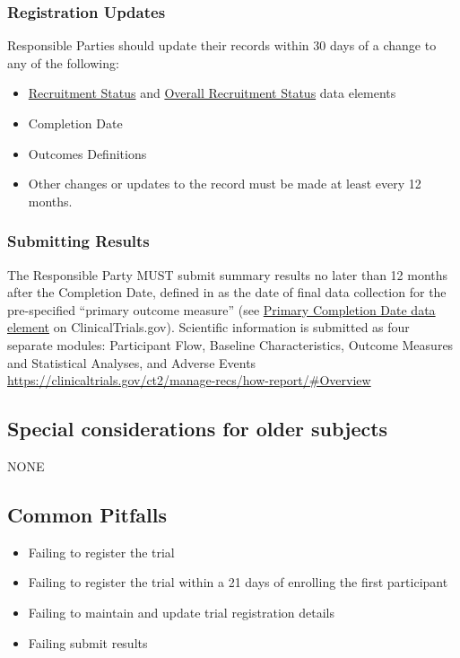 \documentclass[]{book}
\providecommand{\tightlist}{%
  \setlength{\itemsep}{0pt}\setlength{\parskip}{0pt}}
\begin{document}
\subsubsection{Registration Updates}\label{registration-updates}

Responsible Parties should update their records within 30 days of a
change to any of the following:

\begin{itemize}
\tightlist
\item
  \href{http://prsinfo.clinicaltrials.gov/definitions.html\#FacilityStatus}{Recruitment
  Status} and
  \href{http://prsinfo.clinicaltrials.gov/definitions.html\#OverallStatus}{Overall
  Recruitment Status} data elements
\item
  Completion Date
\item
  Outcomes Definitions
\item
  Other changes or updates to the record must be made at least every 12
  months.
\end{itemize}

\subsubsection{Submitting Results}\label{submitting-results}

The Responsible Party MUST submit summary results no later than 12
months after the Completion Date, defined in as the date of final data
collection for the pre-specified ``primary outcome measure'' (see
\href{http://prsinfo.clinicaltrials.gov/definitions.html\#PrimaryCompletionDate}{Primary
Completion Date data element} on ClinicalTrials.gov). Scientific
information is submitted as four separate modules: Participant Flow,
Baseline Characteristics, Outcome Measures and Statistical Analyses, and
Adverse Events
\url{https://clinicaltrials.gov/ct2/manage-recs/how-report/\#Overview}

\subsection{Special considerations for older
subjects}\label{special-considerations-for-older-subjects-3}

NONE

\subsection{Common Pitfalls}\label{common-pitfalls-6}

\begin{itemize}
\tightlist
\item
  Failing to register the trial
\item
  Failing to register the trial within a 21 days of enrolling the first
  participant
\item
  Failing to maintain and update trial registration details
\item
  Failing submit results
\end{itemize}
\end{document}
